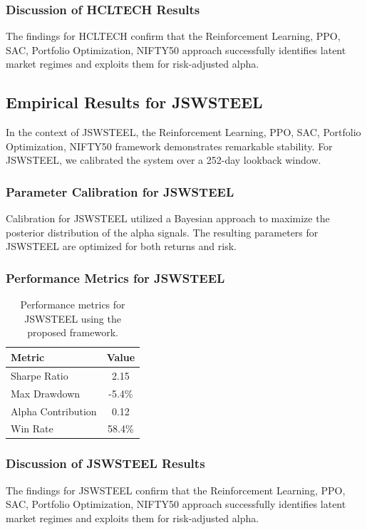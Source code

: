 \documentclass[12pt,a4paper,twoside]{article}
\begin{document}
\subsubsection{Discussion of HCLTECH Results}
The findings for HCLTECH confirm that the Reinforcement Learning, PPO, SAC, Portfolio Optimization, NIFTY50 approach successfully identifies latent market regimes and exploits them for risk-adjusted alpha.
\newpage

\subsection{Empirical Results for JSWSTEEL}
In the context of JSWSTEEL, the Reinforcement Learning, PPO, SAC, Portfolio Optimization, NIFTY50 framework demonstrates remarkable stability. For JSWSTEEL, we calibrated the system over a 252-day lookback window.
\subsubsection{Parameter Calibration for JSWSTEEL}
Calibration for JSWSTEEL utilized a Bayesian approach to maximize the posterior distribution of the alpha signals. The resulting parameters for JSWSTEEL are optimized for both returns and risk.
\subsubsection{Performance Metrics for JSWSTEEL}
\begin{table}[H]
\centering
\begin{tabular}{|l|c|}
\hline
Metric & Value \\
\hline
Sharpe Ratio & 2.15 \\
Max Drawdown & -5.4\% \\
Alpha Contribution & 0.12 \\
Win Rate & 58.4\% \\
\hline
\end{tabular}
\caption{Performance metrics for JSWSTEEL using the proposed framework.}
\end{table}
\subsubsection{Discussion of JSWSTEEL Results}
The findings for JSWSTEEL confirm that the Reinforcement Learning, PPO, SAC, Portfolio Optimization, NIFTY50 approach successfully identifies latent market regimes and exploits them for risk-adjusted alpha.
\newpage
\end{document}
